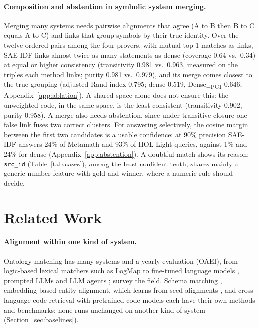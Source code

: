 \documentclass[11pt]{article}
\newcommand{\method}{SAE\mbox{-}IDF\xspace}
\newcommand{\pcone}{Dense\textsubscript{$-$PC1}\xspace}
\begin{document}
\paragraph{Composition and abstention in symbolic system merging.}
Merging many systems needs pairwise alignments that agree (A to B then B to C equals A to C) and links that group symbols by their true identity.
Over the twelve ordered pairs among the four provers, with mutual top-1 matches as links, \method links almost twice as many statements as dense (coverage 0.64 vs.\ 0.34) at equal or higher consistency (transitivity 0.981 vs.\ 0.963, measured on the triples each method links; purity 0.981 vs.\ 0.979), and its merge comes closest to the true grouping (adjusted Rand index 0.795; dense 0.519, \pcone 0.646; Appendix~\ref{app:ablation}).
A shared space alone does not ensure this: the unweighted code, in the same space, is the least consistent (transitivity 0.902, purity 0.958).
A merge also needs abstention, since under transitive closure one false link fuses two correct clusters.
For answering selectively, the cosine margin between the first two candidates is a usable confidence: at 90\% precision \method answers 24\% of Metamath and 93\% of HOL Light queries, against 1\% and 24\% for dense (Appendix~\ref{app:abstention}).
A doubtful match shows its reason: \texttt{src\_id} (Table~\ref{tab:cases}), among the least confident tenth, shares mainly a generic number feature with gold and winner, where a numeric rule should decide.

\section{Related Work}
\label{sec:related}

\paragraph{Alignment within one kind of system.}
Ontology matching has many systems and a yearly evaluation (OAEI), from logic-based lexical matchers such as LogMap \citep{jimenezruiz2011logmap} to fine-tuned language models \citep{he2022bertmap}, prompted LLMs \citep{hertling2023olala} and LLM agents \citep{qiang2025agentom}; \citet{euzenat2013ontology} survey the field.
Schema matching \citep{rahm2001survey, koutras2021valentine}, embedding-based entity alignment, which learns from seed alignments \citep{sun2020benchmarking}, and cross-language code retrieval with pretrained code models \citep{feng2020codebert, guo2022unixcoder} each have their own methods and benchmarks; none runs unchanged on another kind of system (Section~\ref{sec:baselines}).
\end{document}
